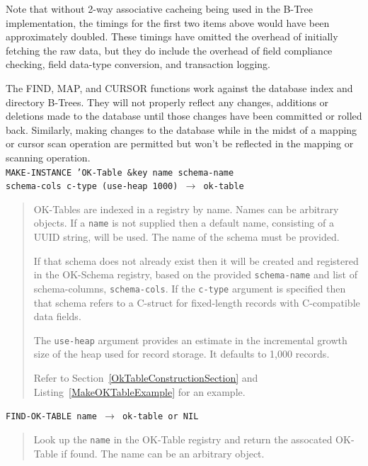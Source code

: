 \documentclass[article,oneside]{memoir}
\begin{document}
Note that without 2-way associative cacheing being used in the B-Tree implementation, the timings for the first two items above would have been approximately doubled. These timings have omitted the overhead of initially fetching the raw data, but they do include the overhead of field compliance checking, field data-type conversion, and transaction logging.

The FIND, MAP, and CURSOR functions work against the database index and directory B-Trees. They will not properly reflect any changes, additions or deletions made to the database until those changes have been committed or rolled back. Similarly, making changes to the database while in the midst of a mapping or cursor scan operation are permitted but won't be reflected in the mapping or scanning operation.
\\

\noindent \texttt{MAKE-INSTANCE 'OK-Table  \&key name schema-name \\ \hspace*{15em} schema-cols c-type (use-heap 1000) $\rightarrow$ ok-table}

\begin{quote}
OK-Tables are indexed in a registry by name. Names can be arbitrary objects. If a \texttt{name} is not supplied then a default name, consisting of a UUID string, will be used. The name of the schema must be provided. 

If that schema does not already exist then it will be created and registered in the OK-Schema registry, based on the provided \texttt{schema-name} and list of schema-columns, \texttt{schema-cols}. If the \texttt{c-type} argument is specified then that schema refers to a C-struct for fixed-length records with C-compatible data fields. 

The \texttt{use-heap} argument provides an estimate in the incremental growth size of the heap used for record storage. It defaults to 1,000 records. 

Refer to Section~\ref{OkTableConstructionSection} and Listing~\ref{MakeOKTableExample} for an example.
\end{quote}

\vspace{1em}
\pagebreak[1]
\noindent \texttt{FIND-OK-TABLE name $\rightarrow$ ok-table or NIL}

\begin{quote}
Look up the \texttt{name} in the OK-Table registry and return the assocated OK-Table if found. The name can be an arbitrary object.

\end{quote}
\end{document}
